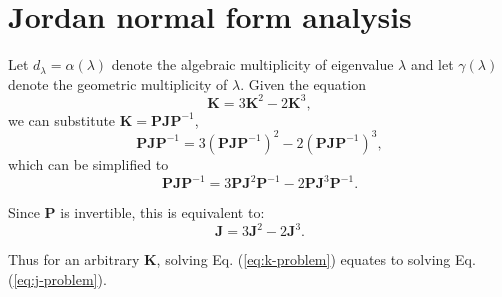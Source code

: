 \documentclass{article}
\theoremstyle{plain}
\theoremstyle{definition}
\theoremstyle{remark}
\newcommand{\vJ}{\mathbf{J}}
\newcommand{\vK}{\mathbf{K}}
\newcommand{\vP}{\mathbf{P}}
\begin{document}
\newpage
\section{Jordan normal form analysis}
\label{app:jordan}
Let ${d_\lambda = \alpha(\lambda)}$ denote the algebraic multiplicity of eigenvalue $\lambda$ and let $\gamma(\lambda)$ denote the geometric multiplicity of $\lambda$. Given the equation
\begin{equation}
    \vK = 3\vK^2 - 2\vK^3,
    \label{eq:k-problem}
\end{equation}
we can substitute $\vK = \vP\vJ\vP^{-1}$,
\begin{equation}
    \vP\vJ\vP^{-1} = 3(\vP\vJ\vP^{-1})^2 - 2(\vP\vJ\vP^{-1})^3,
\end{equation}
which can be simplified to
\begin{equation}
    \vP\vJ\vP^{-1} = 3\vP\vJ^2\vP^{-1} - 2\vP\vJ^3\vP^{-1}.
\end{equation}

Since $\vP$ is invertible, this is equivalent to:
\begin{equation}
    \vJ = 3\vJ^2 - 2\vJ^3.
    \label{eq:j-problem}
\end{equation}

Thus for an arbitrary $\vK$, solving Eq. (\ref{eq:k-problem}) equates to solving Eq. (\ref{eq:j-problem}).
\end{document}
